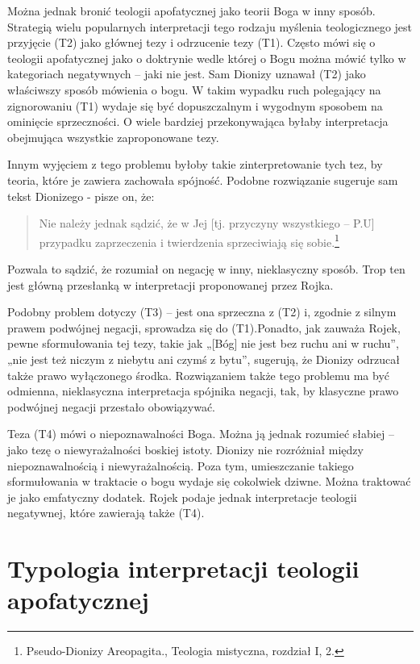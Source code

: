 Można jednak bronić teologii apofatycznej jako teorii Boga w inny
sposób. Strategią wielu popularnych interpretacji tego rodzaju myślenia
teologicznego jest przyjęcie (T2) jako głównej tezy i odrzucenie tezy
(T1). Często mówi się o teologii apofatycznej jako o doktrynie wedle
której o Bogu można mówić tylko w kategoriach negatywnych -- jaki nie
jest. Sam Dionizy uznawał (T2) jako właściwszy sposób mówienia o bogu.
W takim wypadku ruch polegający na zignorowaniu (T1) wydaje się być
dopuszczalnym i wygodnym sposobem na ominięcie sprzeczności. O wiele
bardziej przekonywająca byłaby interpretacja obejmująca wszystkie
zaproponowane tezy.

Innym wyjęciem z tego problemu byłoby takie zinterpretowanie tych tez,
by teoria, które je zawiera zachowała spójność. Podobne rozwiązanie
sugeruje sam tekst Dionizego -  pisze on, że:

\begin{quote}
    Nie należy jednak sądzić, że w Jej [tj. przyczyny wszystkiego -- P.U]
przypadku zaprzeczenia i twierdzenia sprzeciwiają się
sobie.\footnote{Pseudo-Dionizy Areopagita., Teologia mistyczna,
rozdział I, 2. }
\end{quote}




Pozwala to sądzić, że rozumiał on negację w inny, nieklasyczny sposób.
Trop ten jest główną przesłanką w interpretacji proponowanej przez
Rojka.

Podobny problem dotyczy (T3) -- jest ona sprzeczna z (T2) i, zgodnie z
silnym prawem podwójnej negacji, sprowadza się do (T1).Ponadto, jak
zauważa Rojek, pewne sformułowania tej tezy, takie jak „[Bóg] nie jest
bez ruchu ani w ruchu”, „nie jest też niczym z niebytu ani czymś z
bytu”, sugerują, że Dionizy odrzucał także prawo wyłączonego środka.
Rozwiązaniem także tego problemu ma być odmienna, nieklasyczna
interpretacja spójnika negacji, tak, by klasyczne prawo podwójnej
negacji przestało obowiązywać.

Teza (T4) mówi o niepoznawalności Boga. Można ją jednak rozumieć słabiej
– jako tezę o niewyrażalności boskiej istoty. Dionizy nie rozróżniał
między niepoznawalnością i niewyrażalnością. Poza tym, umieszczanie
takiego sformułowania w traktacie o bogu wydaje się cokolwiek dziwne.
Można traktować je jako emfatyczny dodatek. Rojek podaje jednak
interpretacje teologii negatywnej, które zawierają także (T4).




\section{Typologia interpretacji teologii apofatycznej}

